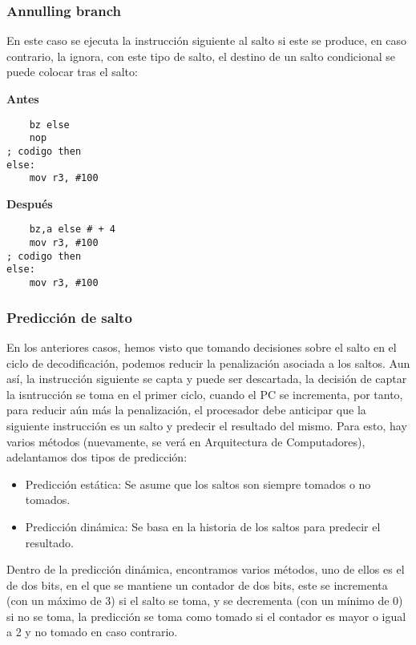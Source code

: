 \subsubsection{Annulling branch}
En este caso se ejecuta la instrucción siguiente al salto si este se produce, en caso contrario, la ignora, con este tipo
de salto, el destino de un salto condicional se puede colocar tras el salto:
\begin{center}
    \begin{minipage}{0.35\textwidth}
        \textbf{Antes}
        \begin{verbatim}
    bz else 
    nop
; codigo then 
else:
    mov r3, #100
        \end{verbatim}
    \end{minipage}
    \begin{minipage}{0.35\textwidth}
        \textbf{Después}
        \begin{verbatim}
    bz,a else # + 4
    mov r3, #100
; codigo then 
else:
    mov r3, #100
        \end{verbatim}
    \end{minipage}
\end{center}

\subsubsection{Predicción de salto}
En los anteriores casos, hemos visto que tomando decisiones sobre el salto en el ciclo de decodificación, 
podemos reducir la penalización asociada a los saltos. Aun así, la instrucción siguiente se capta y puede ser descartada, 
la decisión de captar la isntrucción se toma en el primer ciclo, cuando el PC se incrementa, por tanto, para reducir aún más 
la penalización, el procesador debe anticipar que la siguiente instrucción es un salto y predecir el resultado del mismo. Para esto,
hay varios métodos (nuevamente, se verá en Arquitectura de Computadores), adelantamos dos tipos de predicción:
\begin{itemize}
    \item Predicción estática: Se asume que los saltos son siempre tomados o no tomados.
    \item Predicción dinámica: Se basa en la historia de los saltos para predecir el resultado.
\end{itemize}
Dentro de la predicción dinámica, encontramos varios métodos, uno de ellos es el de dos bits, en el que se mantiene 
un contador de dos bits, este se incrementa (con un máximo de 3) si el salto se toma, y se decrementa (con un mínimo de 0) si no se toma,
la predicción se toma como tomado si el contador es mayor o igual a 2 y no tomado en caso contrario. 
